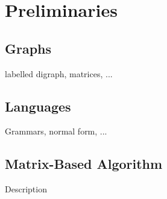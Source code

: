 \section{Preliminaries}

\subsection{Graphs}

labelled digraph, matrices, ...

\subsection{Languages}

Grammars, normal form, ...

\subsection{Matrix-Based Algorithm}

Description